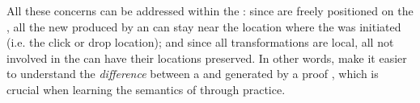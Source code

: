 \begin{scope}
\begin{description}
    All these concerns can be addressed within the  :
    since  are  freely positioned on the , all the new  produced by an  can stay near the
    location where the  was initiated (i.e. the click or drop location);
    and since all transformations are local, all  not involved in the
     can have their locations preserved. In other words,  make
    it easier to understand the \emph{difference} between a  and
     generated by a proof , which is crucial when learning
    the semantics of  through practice.
\end{description}


\end{scope}